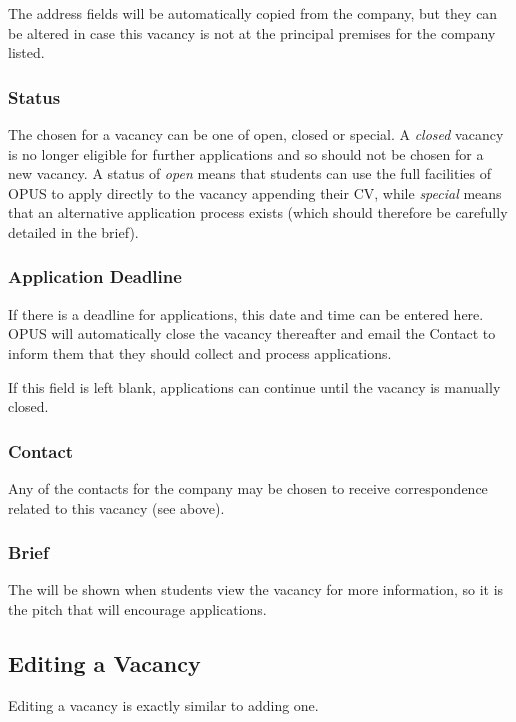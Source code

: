 \documentclass[12 pt]{book}
\begin{document}
The address fields will be automatically copied from the company, but they can
be altered in case this vacancy is not at the principal premises for the 
company listed.

\subsubsection{Status}

The  chosen for a vacancy can be one of open, closed or 
special. A \emph{closed} vacancy is no longer eligible for further applications
and so should not be chosen for a new vacancy. A status of \emph{open} means 
that students can use the full facilities of OPUS to apply directly to the
vacancy appending their CV, while \emph{special} means that an alternative
application process exists (which should therefore be carefully detailed in the
brief).

\subsubsection{Application Deadline}

If there is a deadline for applications, this date and time can be entered 
here. OPUS will automatically close the vacancy thereafter and email the
Contact to inform them that they should collect and process applications.

If this field is left blank, applications can continue until the vacancy is
manually closed.

\subsubsection{Contact}

Any of the contacts for the company may be chosen to receive correspondence
related to this vacancy (see above).

\subsubsection{Brief}

The  will be shown when students view the vacancy for more
information, so it is the pitch that will encourage applications.

\subsection{Editing a Vacancy}

Editing a vacancy is exactly similar to adding one.
\end{document}
